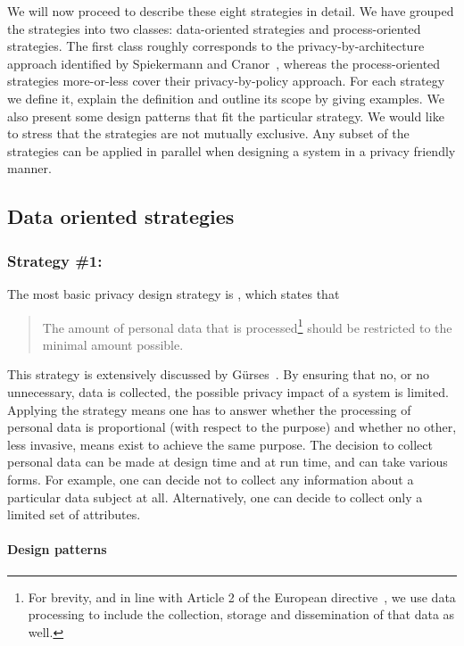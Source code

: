 We will now proceed to describe these eight strategies in detail. 
We have grouped the strategies into two classes: data-oriented strategies and process-oriented strategies. The first class roughly corresponds to the 
privacy-by-archi\-tecture approach identified by Spiekermann and Cranor~\cite{DBLP:journals/tse/SpiekermannC09}, whereas the process-oriented strategies more-or-less cover their privacy-by-policy approach.
For each strategy we define it, explain the definition and outline its scope by giving examples. We also present some design patterns that fit the particular strategy. We would like to stress that the strategies are not mutually exclusive. Any subset of the strategies can be applied in parallel when designing a system in a privacy friendly manner.


\subsection{Data oriented strategies}

\subsubsection{Strategy \#1: }

The most basic privacy design strategy is , which states that 
\begin{quote}
The amount of personal data that is processed\footnote{For brevity, and in line with Article 2 of the European  
  directive~\cite{ec-95-46}, we use data processing to include 
  the collection, storage and dissemination of that data as well.
} 
should be restricted to the minimal amount possible.
\end{quote}
This strategy is extensively discussed by Gürses~\etal\cite{gurses2011engineering-privacy}. By ensuring that no, or no unnecessary, data is collected, the possible privacy impact of a system is limited. Applying the  strategy means one has to answer whether the processing of personal data is proportional (with respect to the purpose) and whether no other, less invasive, means exist to achieve the same purpose. The decision to collect personal data can be made at design time and at run time, and can take various forms.
For example, one can decide not to collect any information about a particular data subject at all. Alternatively, one can decide to collect only a limited set of attributes.

\paragraph{Design patterns}

